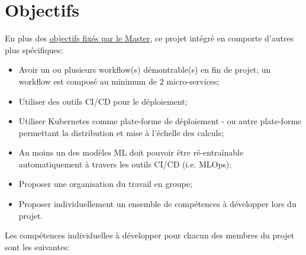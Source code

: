 \section{Objectifs}

En plus des \href{https://www.hes-so.ch/fileadmin/documents/HES-SO/Documents_HES-SO/pdf/ingenierie_architecture/master/Engineering_MSE/Descriptifs_Modules/MSE_-_Descriptif_de_module_-_Projets_Interdisciplinaires__PI__-_V2021-08-31.pdf}{objectifs fixés par le Master}, ce projet intégré en comporte d'autres plus spécifiques:

\begin{itemize}
    \item Avoir un ou plusieurs workflow(s) démontrable(s) en fin de projet; un workflow est composé au minimum de 2 micro-services;
    \item Utiliser des outils CI/CD pour le déploiement;
    \item Utiliser Kubernetes comme plate-forme de déploiement - ou autre plate-forme permettant la distribution et mise à l'échelle des calculs;
    \item Au moins un des modèles ML doit pouvoir être ré-entraînable automatiquement à travers les outils CI/CD (i.e. MLOps);
    \item Proposer une organisation du travail en groupe;
    \item Proposer individuellement un ensemble de compétences à développer lors du projet.
\end{itemize}
\vspace{5mm}

Les compétences individuelles à développer pour chacun des membres du projet sont les suivantes:

